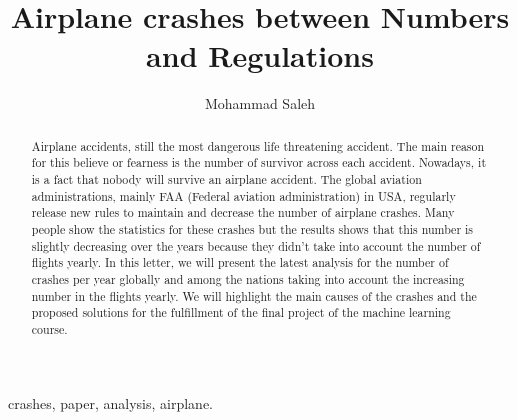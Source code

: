 \documentclass[journal]{IEEEtran}
\begin{document}
%
\title{Airplane crashes between Numbers and Regulations}
%
%
%

\author{Mohammad Saleh}



\maketitle

\begin{abstract}
Airplane accidents, still the most dangerous life threatening accident. The main reason for this believe or fearness is the
number of survivor across each accident. Nowadays, it is a fact that nobody will survive an airplane accident. The global aviation
administrations, mainly FAA (Federal aviation administration) in USA, regularly release new rules to maintain and decrease the number of airplane
crashes. Many people show the statistics for these crashes but the results shows that this number is slightly decreasing over the years
because they didn't take into account the number of flights yearly. In this letter, we will present the latest analysis for the number
 of crashes per year globally and among the nations taking into account the increasing number in the flights yearly. We will highlight
 the main causes of the crashes and the proposed solutions for the fulfillment of the final project of the machine learning course.
\end{abstract}

\begin{IEEEkeywords}
crashes, paper, analysis, airplane.
\end{IEEEkeywords}
\end{document}
